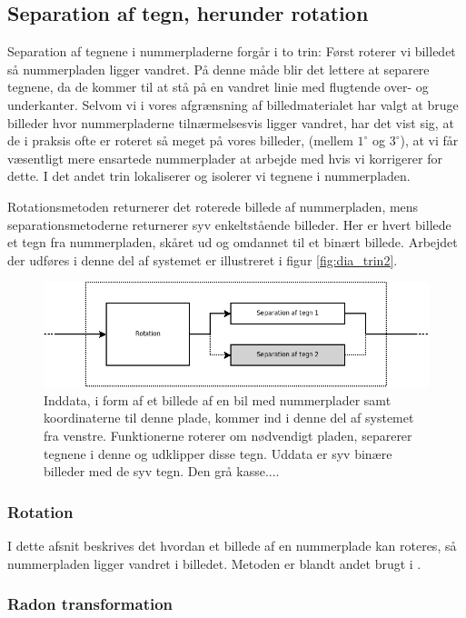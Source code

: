 \subsection{Separation af tegn, herunder rotation}
Separation af tegnene i nummerpladerne forgår i to trin: Først roterer vi billedet så nummerpladen ligger vandret. På denne måde blir det lettere at separere tegnene, da de kommer til at stå på en vandret linie med flugtende over- og underkanter. Selvom vi i vores afgrænsning af billedmaterialet har valgt at bruge billeder hvor nummerpladerne tilnærmelsesvis ligger vandret, har det vist sig, at de i praksis ofte er roteret så meget på vores billeder, (mellem $1^{\circ}$ og $3^{\circ}$), at vi får væsentligt mere ensartede nummerplader at arbejde med hvis vi korrigerer for dette. I det andet trin lokaliserer og isolerer vi tegnene i nummerpladen.

Rotationsmetoden returnerer det roterede billede af nummerpladen, mens separationsmetoderne returnerer syv enkeltstående billeder. Her er hvert billede et tegn fra nummerpladen, skåret ud og omdannet til et binært billede. Arbejdet der udføres i denne del af systemet er illustreret i figur \vref{fig:dia_trin2}.

\begin{figure}[htp]
\centering
\includegraphics[width=12cm]{system/illu/dia_trin2.png} 
\caption{Inddata, i form af et billede af en bil med nummerplader samt koordinaterne til denne plade, kommer ind i denne del af systemet fra venstre. Funktionerne roterer om nødvendigt pladen, separerer tegnene i denne og udklipper disse tegn. Uddata er syv binære billeder med de syv tegn. Den grå kasse....}
\label{fig:dia_trin2}
\end{figure}


\subsubsection{Rotation}
I dette afsnit beskrives det hvordan et billede af en nummerplade kan roteres, så nummerpladen ligger vandret i billedet. Metoden er blandt andet brugt i \cite{shapiro}.


\subsubsection*{Radon transformation}

